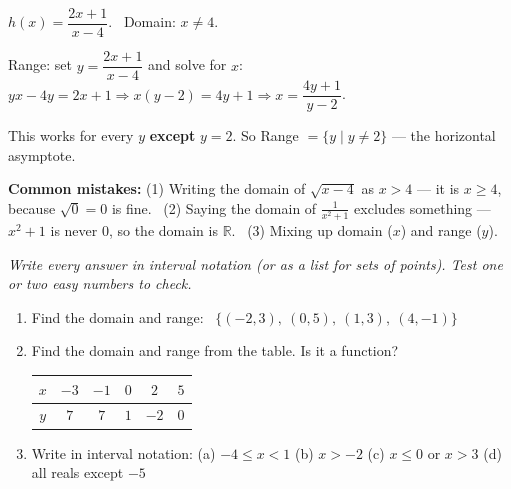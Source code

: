 \documentclass[11pt,letterpaper]{article}
\newif\ifkey
\newcommand{\badge}[2]{\tcbox[on line,colback=#1,colframe=#1,coltext=white,boxrule=0pt,arc=6pt,left=4pt,right=4pt,top=1pt,bottom=1pt,fontupper=\scriptsize\bfseries]{#2}}
\newcommand{\easy}{\badge{FangGreen}{EASY}}
\newcommand{\work}[2][]{\ifkey\begin{sol}#2\end{sol}\else\vspace*{#1}\fi}
\newcommand{\np}[1][6cm]{\needspace{#1}}
\newcommand{\sect}[2]{\par\needspace{7cm}\medskip{\Large\bfseries\color{FangBlue}\tcbox[on line,colback=FangBlue,colframe=FangBlue,coltext=white,arc=2pt,boxrule=0pt,left=5pt,right=5pt,top=1pt,bottom=1pt]{#1}\ #2}\par\smallskip}
\newcommand{\R}{\mathbb{R}}
\begin{document}
\begin{example}
$h(x)=\dfrac{2x+1}{x-4}$. \ Domain: $x\neq4$.\par
Range: set $y=\dfrac{2x+1}{x-4}$ and solve for $x$: \ $yx-4y=2x+1 \Rightarrow x(y-2)=4y+1 \Rightarrow x=\dfrac{4y+1}{y-2}$.\par
This works for every $y$ \textbf{except} $y=2$. So Range $=\{y\mid y\neq2\}$ — the horizontal asymptote.
\end{example}

\begin{warn}
\textbf{Common mistakes:} (1) Writing the domain of $\sqrt{x-4}$ as $x>4$ — it is $x\ge4$, because $\sqrt0=0$ is fine. \ (2) Saying the domain of $\frac{1}{x^2+1}$ excludes something — $x^2+1$ is never $0$, so the domain is $\R$. \ (3) Mixing up domain ($x$) and range ($y$).
\end{warn}

\newpage
\sect{5}{Practice}
\ifkey\else\textit{Write every answer in interval notation (or as a list for sets of points). Test one or two easy numbers to check.}\fi

\medskip
{} \easy

\begin{enumerate}[leftmargin=*,label=\textbf{\arabic*.},itemsep=6pt]
\np[4cm]\item Find the domain and range: \ $\{(-2,3),\ (0,5),\ (1,3),\ (4,-1)\}$
\work[1.2cm]{Domain $\{-2,0,1,4\}$; \quad Range $\{-1,3,5\}$ (write $3$ only once).}

\np[4cm]\item Find the domain and range from the table. Is it a function?
\qquad\begin{tabular}{c|ccccc}$x$&$-3$&$-1$&$0$&$2$&$5$\\\hline $y$&$7$&$7$&$1$&$-2$&$0$\end{tabular}
\work[1.2cm]{Domain $\{-3,-1,0,2,5\}$; \quad Range $\{-2,0,1,7\}$. \quad Yes, a function: no $x$ repeats (a repeated $y$ is fine).}

\np[4cm]\item Write in interval notation: \quad (a) $-4\le x<1$ \qquad (b) $x>-2$ \qquad (c) $x\le0$ or $x>3$ \qquad (d) all reals except $-5$
\work[1.4cm]{(a) $[-4,1)$ \qquad (b) $(-2,\infty)$ \qquad (c) $(-\infty,0]\cup(3,\infty)$ \qquad (d) $(-\infty,-5)\cup(-5,\infty)$}
\end{enumerate}
\end{document}
